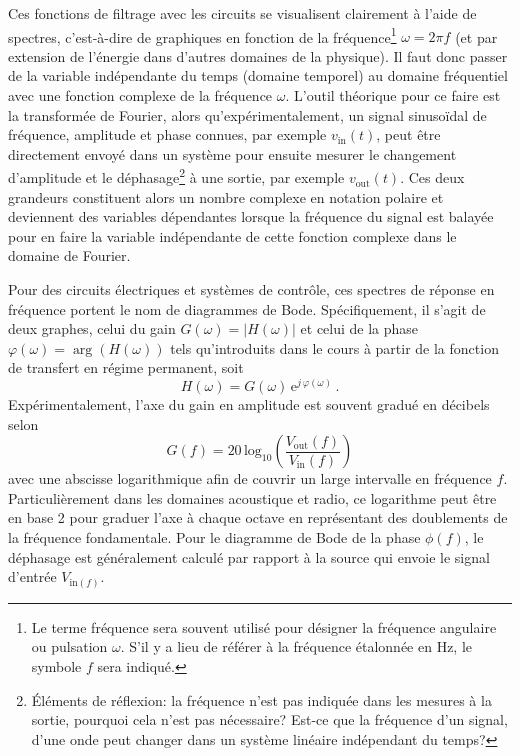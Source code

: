 \documentclass[canadien,12pt,oneside,letterpaper]{article}
\begin{document}
Ces fonctions de filtrage avec les circuits se visualisent clairement à l'aide de spectres, c'est-à-dire de graphiques en fonction de la fréquence\footnote{Le terme fréquence sera souvent utilisé pour désigner la fréquence angulaire ou pulsation $\omega$. S'il y a lieu de référer à la fréquence étalonnée en \si{\hertz}, le symbole $f$ sera indiqué.} $\omega=2\pi f$ (et par extension de l'énergie dans d'autres domaines de la physique). Il faut donc passer de la variable indépendante du temps (domaine temporel) au domaine fréquentiel avec une fonction complexe de la fréquence $\omega$. L'outil théorique pour ce faire est la transformée de Fourier, alors qu'expérimentalement, un signal sinusoïdal de fréquence, amplitude et phase connues, par exemple $v_{\mathrm{in}}(t)$, peut être directement envoyé dans un système pour ensuite mesurer le changement d'amplitude et le déphasage\footnote{Éléments de réflexion: la fréquence n'est pas indiquée dans les mesures à la sortie, pourquoi cela n'est pas nécessaire? Est-ce que la fréquence d'un signal, d'une onde peut changer dans un système linéaire indépendant du temps?} à une sortie, par exemple $v_{\mathrm{out}}(t)$. Ces deux grandeurs constituent alors un nombre complexe en notation polaire et deviennent des variables dépendantes lorsque la fréquence du signal est balayée pour en faire la variable indépendante de cette fonction complexe dans le domaine de Fourier.

Pour des circuits électriques et systèmes de contrôle, ces spectres de réponse en fréquence portent le nom de diagrammes de Bode. Spécifiquement, il s'agit de deux graphes, celui du gain $G(\omega)=\left|H\!\left(\omega\right)\right|$ et celui de la phase $\varphi(\omega)=\arg\left( H\!\left(\omega\right)\right)$ tels qu'introduits dans le cours à partir de la fonction de transfert en régime permanent, soit 
\begin{equation} \label{eq:GainPhase}
H\!\left(\omega\right)=G\!\left(\omega\right)\,\mathrm{e}^{j\,\varphi(\omega)}\, .
\end{equation}
Expérimentalement, l'axe du gain en amplitude est souvent gradué en décibels selon \[G\!\left(f\right)=20\,\textrm{log}_{10}\left(\frac{V_{\mathrm{out}}(f)}{V_{\mathrm{in}}(f)}\right)\]
avec une abscisse logarithmique afin de couvrir un large intervalle en fréquence $f$. Particulièrement dans les domaines acoustique et radio, ce logarithme peut être en base 2 pour graduer l'axe à chaque octave en représentant des doublements de la fréquence fondamentale. Pour le diagramme de Bode de la phase $\phi\!\left(f\right)$, le déphasage est généralement calculé par rapport à la source qui envoie le signal d'entrée $V_{\mathrm{in}(f)}$.
\end{document}
